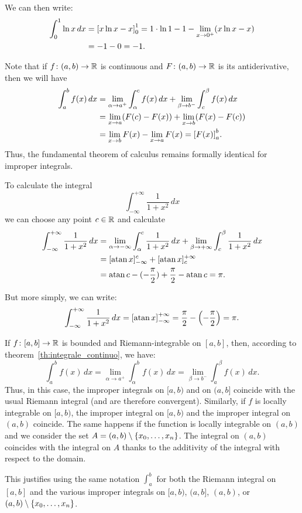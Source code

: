 We can then write:
\begin{align*}
  \int_0^1 \ln x\, dx
  &= {\left[ x\ln x- x \right]}_0^1
  = 1 \cdot\ln 1 -1 - \lim_{x\to 0^+} (x\ln x - x) \\
  &= -1  - 0 = -1.
\end{align*}

Note that if $f\colon(a,b) \to {\mathbb R}$ is continuous and $F\colon(a,b)\to {\mathbb R}$ is
its antiderivative, then we will have
\begin{align*}
  \int_a^b f(x)\, dx
   &= \lim_{\alpha\to a^+}\int_{\alpha}^c f(x)\, dx
   + \lim_{\beta\to b^-}\int_c^{\beta} f(x)\, dx \\
   & = \lim_{x\to a} (F(c)-F(x)) + \lim_{x\to b} (F(x)-F(c)) \\
   & = \lim_{x\to b} F(x) - \lim_{x\to a} F(x)
   = {\left[ F(x) \right]}_a^b.
\end{align*}
Thus, the fundamental theorem of calculus remains formally identical for
improper integrals.

\begin{example}
To calculate the integral
\[
  \int_{-\infty}^{+\infty} \frac{1}{1+x^2}\, dx
\]
we can choose any point $c\in {\mathbb R}$ and calculate
\begin{align*}
\int_{-\infty}^{+\infty}\frac{1}{1+x^2}\, dx
&=
\lim_{\alpha\to-\infty}\int_\alpha^c \frac{1}{1+x^2}\, dx
  + \lim_{\beta\to+\infty}\int_c^\beta \frac{1}{1+x^2}\, dx\\
  &= [\operatorname{atan} x]_{-\infty}^c
  + [\operatorname{atan} x]_c^{+\infty}  \\
  &= \operatorname{atan} c - (-\frac\pi 2) + \frac \pi 2 - \operatorname{atan} c
  = \pi.
\end{align*}

But more simply, we can write:
\[
 \int_{-\infty}^{+\infty}\frac{1}{1+x^2}\, dx
 = {\left[ \operatorname{atan} x \right]}_{-\infty}^{+\infty}
 = \frac \pi 2 - {\left( -\frac \pi 2 \right)} = \pi.
 \]

\end{example}

\begin{remark}
If $f\colon[a,b]\to{\mathbb R}$ is bounded and Riemann-integrable on $[a,b]$, then,
according to theorem~\ref{th:integrale_continuo}, we have:
\[
 \int_a^b f(x)\, dx
  = \lim_{\alpha \to a^+} \int_\alpha^b f(x)\, dx
  = \lim_{\beta\to b^-}\int_a^\beta f(x)\,dx.
\]
Thus, in this case, the improper integrals on $[a,b)$ and on $(a,b]$ coincide
with the usual Riemann integral (and are therefore convergent). Similarly, if
$f$ is locally integrable on $[a,b)$, the improper integral on $[a,b)$ and the
improper integral on $(a,b)$ coincide. The same happens if the function is
locally integrable on $(a,b)$ and we consider the set
$A=(a,b)\setminus{\left\{ x_0,\dots,x_n \right\}}$. The integral on $(a,b)$ coincides
with the integral on $A$ thanks to the additivity of the integral with respect
to the domain.

This justifies using the same notation $\int_a^b$ for both the Riemann integral
on $[a,b]$ and the various improper integrals on $[a,b)$, $(a,b]$, $(a,b)$, or
$(a,b)\setminus{\left\{ x_0, \dots, x_n \right\}}$.
\end{remark}


